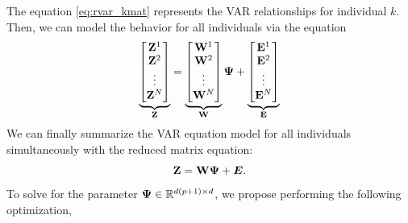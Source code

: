 The equation \eqref{eq:rvar_kmat} represents the VAR relationships for individual $k$. Then, we can model the behavior for all individuals via the equation
\begin{equation*}
	\underbrace{\begin{bmatrix}  \mathbf{Z}^1 \\ \mathbf{Z}^2  \\ \vdots \\ \mathbf{Z}^N \end{bmatrix}}_{\mathbf{Z}} = 
	\underbrace{\begin{bmatrix}  \mathbf{W}^1 \\ \mathbf{W}^2  \\ \vdots \\ \mathbf{W}^N \end{bmatrix}}_{\mathbf{W}}  
	\bm{\Psi} + 
	\underbrace{\begin{bmatrix}  \mathbf{E}^1 \\ \mathbf{E}^2 \\ \vdots \\ \mathbf{E}^N \end{bmatrix}}_{\mathbf{E}} 
\end{equation*}
We can finally summarize the VAR equation model for all individuals simultaneously with the reduced matrix equation:
\begin{equation}\label{eq:rvar_mat}
	\mathbf{Z} = \mathbf{W} \bm{\Psi} + \bm{E}.
\end{equation}
To solve for the parameter $\bm{\Psi}\in\mathbb{R}^{d (p+1) \times d}$, we propose performing the following optimization,

